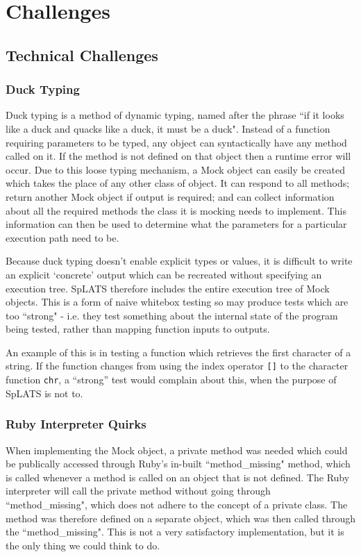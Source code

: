 \chapter{Challenges}
\section{Technical Challenges}
  \subsection{Duck Typing}
    Duck typing is a method of dynamic typing, named after the phrase ``if it looks like a duck and quacks like a duck, it must be a duck". Instead of a function requiring parameters to be typed, any object can syntactically have any method called on it. If the method is not defined on that object then a runtime error will occur. Due to this loose typing mechanism, a Mock object can easily be created which takes the place of any other class of object. It can respond to all methods; return another Mock object if output is required; and can collect information about all the required methods the class it is mocking needs to implement. This information can then be used to determine what the parameters for a particular execution path need to be.
    
    Because duck typing doesn't enable explicit types or values, it is difficult to write an explicit `concrete' output which can be recreated without specifying an execution tree. SpLATS therefore includes the entire execution tree of Mock objects. This is a form of naive whitebox testing so may produce tests which are too ``strong" - i.e. they test something about the internal state of the program being tested, rather than mapping function inputs to outputs.
    
    An example of this is in testing a function which retrieves the first character of a string. If the function changes from using the index operator \texttt{[]} to the character function \texttt{chr}, a ``strong'' test would complain about this, when the purpose of SpLATS is not to.
    
  \subsection{Ruby Interpreter Quirks}
    When implementing the Mock object, a private method was needed which could be publically accessed through Ruby's in-built ``method\_missing" method, which is called whenever a method is called on an object that is not defined. The Ruby interpreter will call the private method without going through ``method\_missing", which does not adhere to the concept of a private class. The method was therefore defined on a separate object, which was then called through the ``method\_missing". This is not a very satisfactory implementation, but it is the only thing we could think to do.
    
